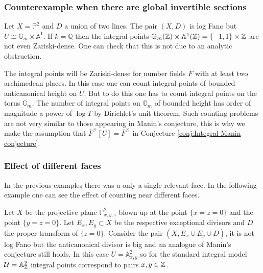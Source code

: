 \documentclass[a4paper,11pt,reqno]{amsart}
\newcommand{\Q}{\mathbb{Q}}
\newcommand{\G}{\mathbb{G}}
\newcommand{\A}{\mathbb{A}}
\newcommand{\Proj}{\mathbb{P}}
\theoremstyle{definition}
\begin{document}
\subsubsection{Counterexample when there are global invertible sections}\label{sec:Counterexample when there are global invertible sections}
Let $X = \Proj^2$ and $D$ a union of two lines. The pair $(X, D)$ is log Fano but $U \cong \G_m \times \A^1$. If $k = \Q$ then the integral points $\G_m(\Z) \times \A^1(\Z) = \{-1,1\} \times \Z$ are not even Zariski-dense. One can check that this is not due to an analytic obstruction.

The integral points will be Zariski-dense for number fields $F$ with at least two archimedean places. In this case one can count integral points of bounded anticanonical height on $U$. But to do this one has to count integral points on the torus $\G_m$. The number of integral points on $\G_m$ of bounded height has order of magnitude a power of $\log T$ by Dirichlet's unit theorem. Such counting problems are not very similar to those appearing in Manin's conjecture, this is why we make the assumption that $\overline{F}^{\times}[U] = \overline{F}^{\times}$ in Conjecture \ref{conj:Integral Manin conjecture}.
\subsubsection{Effect of different faces}
In the previous examples there was a only a single relevant face. In the following example one can see the effect of counting near different faces.

Let $X$ be the projective plane $\Proj^2_{x,y,z}$ blown up at the point $\{x = z = 0\}$ and the point $\{y = z = 0\}$. Let $E_x, E_y \subset X$ be the respective exceptional divisors and $D$ the proper transform of $\{z = 0\}$. Consider the pair $(X, E_x \cup E_y \cup D)$, it is not log Fano but the anticanonical divisor is big and an analogue of Manin's conjecture still holds. In this case $U = \A^2_{x,y}$ so for the standard integral model $\mathcal{U} = \A^2_{\Z}$ integral points correspond to pairs $x,y \in \mathbb{Z}$.
	
\end{document}

